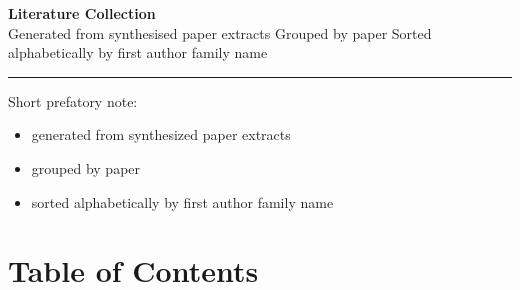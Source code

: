 \documentclass[11pt,a4paper]{article}
\begin{document}
\begin{center}
  {\LARGE\bfseries Literature Collection}\\[6pt]
  {\small Generated from synthesised paper extracts\quad\textbar\quad
         Grouped by paper\quad\textbar\quad
         Sorted alphabetically by first author family name}
\end{center}
\vspace{1em}\hrule\vspace{1em}


Short prefatory note:
\begin{itemize}
  \item generated from synthesized paper extracts
  \item grouped by paper
  \item sorted alphabetically by first author family name
\end{itemize}

\section*{Table of Contents}
\end{document}
